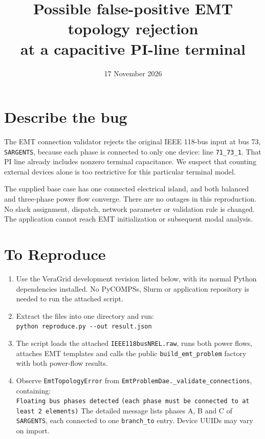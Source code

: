 \documentclass[11pt,a4paper]{article}
\title{Possible false-positive EMT topology rejection\\at a capacitive PI-line terminal}
\author{}
\date{17 November 2026}
\begin{document}
\maketitle
\vspace{-12mm}

\section*{Describe the bug}
The EMT connection validator rejects the original IEEE 118-bus input at bus
73, \texttt{SARGENTS}, because each phase is connected to only one device:
line \texttt{71\_73\_1}. That PI line already includes nonzero terminal
capacitance. We suspect that counting external devices alone is too
restrictive for this particular terminal model.

The supplied base case has one connected electrical island, and both balanced
and three-phase power flow converge. There are no outages in this reproduction.
No slack assignment, dispatch, network parameter or validation rule is changed.
The application cannot reach EMT initialization or subsequent modal analysis.

\section*{To Reproduce}
\begin{enumerate}
\item Use the VeraGrid development revision listed below, with its normal
Python dependencies installed. No PyCOMPSs, Slurm or application repository
is needed to run the attached script.
\item Extract the files into one directory and run:\\
\verb|python reproduce.py --out result.json|
\item The script loads the attached \texttt{IEEE118busNREL.raw}, runs both
power flows, attaches EMT templates and calls the public
\texttt{build\_emt\_problem} factory with both power-flow results.
\item Observe \texttt{EmtTopologyError} from
\texttt{EmtProblemDae.\_validate\_connections}, containing:\\
\texttt{Floating bus phases detected}\newline
\texttt{(each phase must be connected to at least 2 elements)}\newline
The detailed message lists phases A, B and C of \texttt{SARGENTS}, each
connected to one \texttt{branch\_to} entry. Device UUIDs may vary on import.
\end{enumerate}
\end{document}
